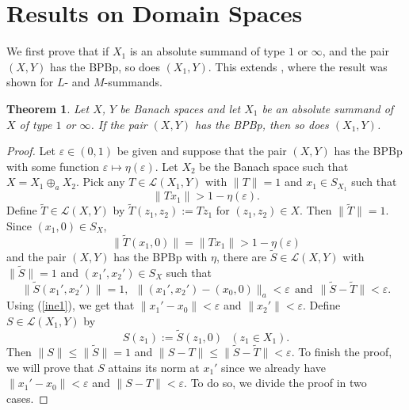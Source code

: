 \documentclass[10pt,a4paper]{amsart}
\theoremstyle{plain}
\newtheorem{theorem}{Theorem}[section]
\theoremstyle{definition}
\newcommand{\eps}{\varepsilon}
\renewcommand{\leq}{\leqslant}
\begin{document}
\section{Results on Domain Spaces} \label{domain}

We first prove that if $X_1$ is an absolute summand of type $1$ or $\infty$, and the pair $(X, Y)$ has the BPBp, so does $(X_1, Y)$. This extends \cite[Proposition 2.6]{ACKLM}, where the result was shown for $L$- and $M$-summands.

\begin{theorem} \label{domain1} Let $X$, $Y$ be Banach spaces and let $X_1$ be an absolute summand of $X$ of type $1$ or $\infty$. If the pair $(X, Y)$ has the BPBp, then so does $(X_1, Y)$.
\end{theorem}


\begin{proof} Let $\eps \in (0, 1)$ be given and suppose that the pair $(X, Y)$ has the BPBp with some function $\eps \longmapsto \eta(\eps)$. Let $X_2$ be the Banach space such that $X = X_1 \oplus_a X_2$. Pick any $T \in \mathcal{L} (X_1, Y)$ with $\|T\| = 1$ and $x_1 \in S_{X_1}$ such that
\begin{equation*} 	
\|T x_1\| > 1 - \eta(\eps).
\end{equation*}
Define $\widetilde{T} \in \mathcal{L} (X, Y)$ by $\widetilde{T} (z_1, z_2) := Tz_1$ for $(z_1, z_2) \in X$. Then $\|\widetilde{T}\| = 1$. Since $(x_1, 0) \in S_X$,
\begin{equation*}
\|\widetilde{T} (x_1, 0)\| = \|Tx_1\| > 1 - \eta(\eps)
\end{equation*}
and the pair $(X, Y)$ has the BPBp with $\eta$, there are $\widetilde{S} \in \mathcal{L} (X, Y)$ with $\| \widetilde{S}\| = 1$ and $(x_1', x_2') \in S_X$ such that
\begin{equation*}
\| \widetilde{S} (x_1', x_2') \| = 1, \ \ \|(x_1', x_2') - (x_0, 0)\|_a < \eps \ \ \mbox{and} \ \ \| \widetilde{S} - \widetilde{T} \| < \eps.
\end{equation*}
Using (\ref{ine1}), we get that $\|x_1' - x_0\| < \eps$ and $\|x_2'\| < \eps$. Define $S \in \mathcal{L} (X_1, Y)$ by
\begin{equation*}
S(z_1) := \widetilde{S} (z_1, 0)  \ \ \ (z_1 \in X_1).
\end{equation*}
Then $\|S\| \leq \|\widetilde{S}\| = 1$ and $\|S - T\| \leq \|\widetilde{S} - \widetilde{T}\| < \eps$. To finish the proof, we will prove that $S$ attains its norm at $x_1'$ since we already have $\|x_1' - x_0\| < \eps$ and $\|S - T\| < \eps$. To do so, we divide the proof in two cases.


\end{proof}
\end{document}
